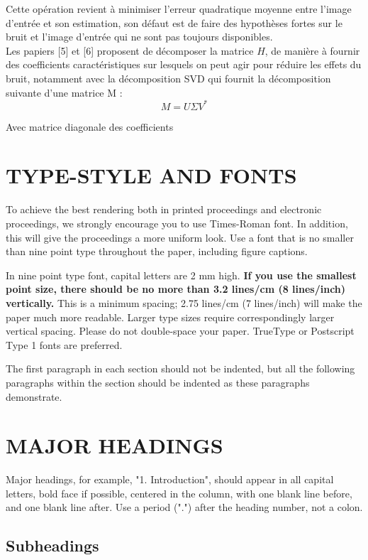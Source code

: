 \documentclass{article}
\begin{document}
	Cette opération revient à minimiser l'erreur quadratique moyenne entre l'image d'entrée et son estimation, son défaut est de faire des hypothèses fortes sur le bruit et l'image d'entrée qui ne sont pas toujours disponibles.
	\\
	
	Les papiers [5] et [6] proposent de décomposer la matrice $H$, de manière à fournir des coefficients caractéristiques sur lesquels on peut agir pour réduire les effets du bruit, notamment avec la décomposition SVD qui fournit la décomposition suivante d'une matrice M :
	$$ M = U \Sigma V^*$$
	
	Avec \Sigma matrice diagonale des coefficients
	
	
	
\section{TYPE-STYLE AND FONTS}
\label{sec:typestyle}

To achieve the best rendering both in printed proceedings and electronic proceedings, we
strongly encourage you to use Times-Roman font.  In addition, this will give
the proceedings a more uniform look.  Use a font that is no smaller than nine
point type throughout the paper, including figure captions.

In nine point type font, capital letters are 2 mm high.  {\bf If you use the
smallest point size, there should be no more than 3.2 lines/cm (8 lines/inch)
vertically.}  This is a minimum spacing; 2.75 lines/cm (7 lines/inch) will make
the paper much more readable.  Larger type sizes require correspondingly larger
vertical spacing.  Please do not double-space your paper.  TrueType or
Postscript Type 1 fonts are preferred.

The first paragraph in each section should not be indented, but all the
following paragraphs within the section should be indented as these paragraphs
demonstrate.

\section{MAJOR HEADINGS}
\label{sec:majhead}

Major headings, for example, "1. Introduction", should appear in all capital
letters, bold face if possible, centered in the column, with one blank line
before, and one blank line after. Use a period (".") after the heading number,
not a colon.

\subsection{Subheadings}
\label{ssec:subhead}
\end{document}
